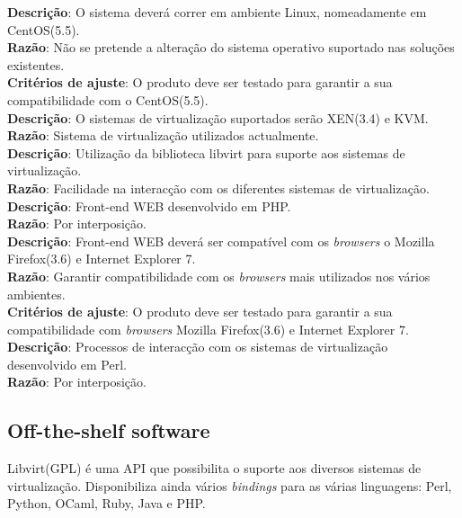 \documentclass[a4paper,11pt,titlepage]{article}
\begin{document}
  \noindent \textbf{Descrição}: O sistema deverá correr em ambiente Linux, nomeadamente em CentOS(5.5). \\
  \textbf{Razão}: Não se pretende a alteração do sistema operativo suportado nas soluções existentes. \\
  \textbf{Critérios de ajuste}: O produto deve ser testado para garantir a sua compatibilidade com o CentOS(5.5). \\

  \noindent \textbf{Descrição}: O sistemas de virtualização suportados serão XEN(3.4) e KVM. \\
  \textbf{Razão}: Sistema de virtualização utilizados actualmente. \\

  \noindent \textbf{Descrição}: Utilização da biblioteca libvirt para suporte aos sistemas de virtualização. \\
  \textbf{Razão}: Facilidade na interacção com os diferentes sistemas de virtualização. \\

  \noindent \textbf{Descrição}: Front-end WEB desenvolvido em PHP. \\
  \textbf{Razão}: Por interposição. \\

  \noindent \textbf{Descrição}: Front-end WEB deverá ser compatível com os \emph{browsers} o Mozilla Firefox(3.6) e Internet Explorer 7. \\
  \textbf{Razão}:  Garantir compatibilidade com os \emph{browsers} mais utilizados nos vários ambientes. \\
  \textbf{Critérios de ajuste}: O produto deve ser testado para garantir a sua compatibilidade com \emph{browsers} Mozilla Firefox(3.6) e Internet Explorer 7. \\

  \noindent \textbf{Descrição}: Processos de interacção com os sistemas de virtualização desenvolvido em Perl. \\
  \textbf{Razão}: Por interposição. \\

\subsection{Off-the-shelf software}
Libvirt(GPL) é uma API que possibilita o suporte aos diversos sistemas de virtualização.
Disponibiliza ainda vários \emph{bindings} para as várias linguagens: Perl, Python, OCaml, Ruby, Java e PHP.
\end{document}
